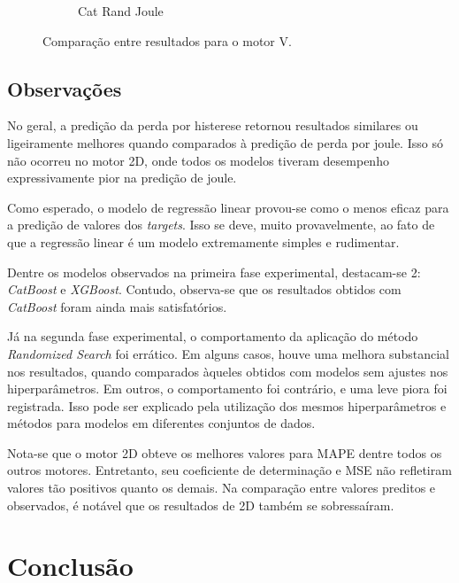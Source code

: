 \documentclass{article}
\begin{document}
\begin{figure}[!htbp]
\begin{subfigure}[b]{0.23\textwidth}
        \caption{Cat Rand Joule}
    \end{subfigure}
    \hfill
    \begin{subfigure}[b]{0.23\textwidth}
        \centering
        \null
    \end{subfigure}
    
    \caption{Comparação entre resultados para o motor V.}
\end{figure}

\newpage

\subsection{Observações}

No geral, a predição da perda por histerese retornou resultados similares ou ligeiramente melhores quando comparados à predição de perda por joule. Isso só não ocorreu no motor 2D, onde todos os modelos tiveram desempenho expressivamente pior na predição de joule.

Como esperado, o modelo de regressão linear provou-se como o menos eficaz para a predição de valores dos \textit{targets}. Isso se deve, muito provavelmente, ao fato de que a regressão linear é um modelo extremamente simples e rudimentar.

Dentre os modelos observados na primeira fase experimental, destacam-se 2: \textit{CatBoost} e \textit{XGBoost}. Contudo, observa-se que os resultados obtidos com \textit{CatBoost} foram ainda mais satisfatórios.

Já na segunda fase experimental, o comportamento da aplicação do método \textit{Randomized Search} foi errático. Em alguns casos, houve uma melhora substancial nos resultados, quando comparados àqueles obtidos com modelos sem ajustes nos hiperparâmetros. Em outros, o comportamento foi contrário, e uma leve piora foi registrada. Isso pode ser explicado pela utilização dos mesmos hiperparâmetros e métodos para modelos em diferentes conjuntos de dados.

Nota-se que o motor 2D obteve os melhores valores para MAPE dentre todos os outros motores. Entretanto, seu coeficiente de determinação e MSE não refletiram valores tão positivos quanto os demais. Na comparação entre valores preditos e observados, é notável que os resultados de 2D também se sobressaíram.

\section{Conclusão}
\end{document}
